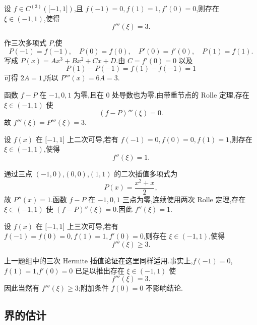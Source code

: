 \begin{example}
    设 $f\in C^{(3)}(\lbrack -1,1\rbrack)$,且 $f(-1)=0,f(1)=1,f'(0)=0$,则存在 $\xi\in(-1,1)$,使得
    \[
        f'''(\xi)=3.
    \]
\end{example}
\exampleblank

\begin{solution}
    作三次多项式 $P$,使
    \[
        P(-1)=f(-1),
        \quad P(0)=f(0),
        \quad P'(0)=f'(0),
        \quad P(1)=f(1).
    \]
    写成 $P(x)=Ax^3+Bx^2+Cx+D$.由 $C=f'(0)=0$ 以及
    \[
        P(1)-P(-1)=f(1)-f(-1)=1
    \]
    可得 $2A=1$,所以 $P'''(x)=6A=3$.

    函数 $f-P$ 在 $-1,0,1$ 为零,且在 $0$ 处导数也为零.由带重节点的 Rolle 定理,存在 $\xi\in(-1,1)$ 使
    \[
        (f-P)'''(\xi)=0.
    \]
    故 $f'''(\xi)=P'''(\xi)=3$.
\end{solution}

\begin{example}
    设 $f(x)$ 在 $\lbrack -1,1\rbrack$ 上二次可导,若有 $f(-1)=0,f(0)=0,f(1)=1$,则存在 $\xi\in(-1,1)$,使得
    \[
        f''(\xi)=1.
    \]
\end{example}
\exampleblank

\begin{solution}
    通过三点 $(-1,0)$,$(0,0)$,$(1,1)$ 的二次插值多项式为
    \[
        P(x)=\dfrac{x^2+x}{2},
    \]
    故 $P''(x)=1$.函数 $f-P$ 在 $-1,0,1$ 三点为零,连续使用两次 Rolle 定理,存在 $\xi\in(-1,1)$ 使 $(f-P)''(\xi)=0$.因此 $f''(\xi)=1$.
\end{solution}

\begin{example}
    设 $f(x)$ 在 $\lbrack -1,1\rbrack$ 上三次可导,若有 $f(-1)=f(0)=0,f(1)=1,f'(0)=0$,则存在 $\xi\in(-1,1)$,使得
    \[
        f'''(\xi)\geq 3.
    \]
\end{example}
\exampleblank

\begin{solution}
    上一题组中的三次 Hermite 插值论证在这里同样适用.事实上,$f(-1)=0$,$f(1)=1$,$f'(0)=0$ 已足以推出存在 $\xi\in(-1,1)$ 使
    \[
        f'''(\xi)=3.
    \]
    因此当然有 $f'''(\xi)\geq3$;附加条件 $f(0)=0$ 不影响结论.
\end{solution}



\subsection{界的估计}

